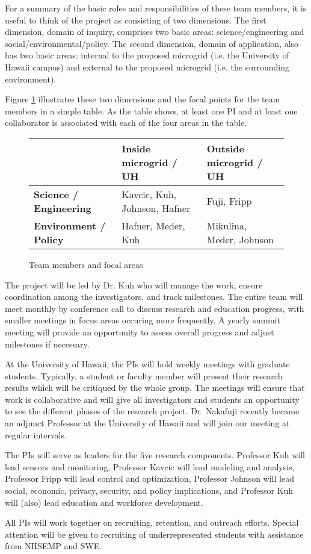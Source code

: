For a summary of the basic roles and responsibilities of these team
members, it is useful to think of the project as consisting of two
dimensions.  The first dimension, domain of inquiry, comprises two basic
areas: science/engineering and social/environmental/policy.  The second
dimension, domain of application, also has two basic areas: internal to the
proposed microgrid (i.e. the University of Hawaii campus) and external to
the proposed microgrid (i.e. the surrounding environment).

Figure \ref{fig:team}
illustrates these two dimensions and the focal points for the team
members in a simple table.  As the table shows, at least one PI and at
least one collaborator is associated with each of the four areas in the
table. 


\begin{figure}
\begin{tabular}{|p{1.8in}|p{2.0in}|p{1.8in}|}
\hline
& {\bf Inside microgrid / UH} & {\bf Outside microgrid / UH}  \\ \hline
{\bf Science / Engineering} & Kavcic, Kuh, Johnson, Hafner & Fuji, Fripp \\ \hline
{\bf Environment / Policy} & Hafner, Meder, Kuh & Mikulina, Meder, Johnson \\ \hline
\end{tabular} 
\caption{Team members and focal areas}
\label{fig:team}
\end{figure}


The project will be led by Dr. Kuh who will manage the work, ensure
coordination among the investigators, and track milestones. The entire team
will meet monthly by conference call to discuss research and education
progress, with smaller meetings in focus areas occuring more frequently.  A
yearly summit meeting will provide an opportunity to assess overall
progress and adjust milestones if necessary.

At the University of Hawaii, the PIs will hold weekly meetings
with graduate students.  Typically, a student or faculty member will
present their research results which will be critiqued by the whole group.
The meetings will ensure that work is collaborative and will give all
investigators and students an opportunity to see the different phases of
the research project.  Dr. Nakafuji recently became an adjunct Professor at
the University of Hawaii and will join our meeting at regular intervals.

The PIs will serve as leaders for the five research components. Professor
Kuh will lead sensors and monitoring, Professor Kavcic will lead
modeling and analysis, Professor Fripp will lead control and optimization,
Professor Johnson will lead social, economic, privacy, security, and policy
implications, and Professor Kuh will (also) lead education and workforce
development. 

All PIs will work together on recruiting, retention, and outreach
efforts.  Special attention will be given to recruiting of underrepresented
students with assistance from NHSEMP and SWE.
 
